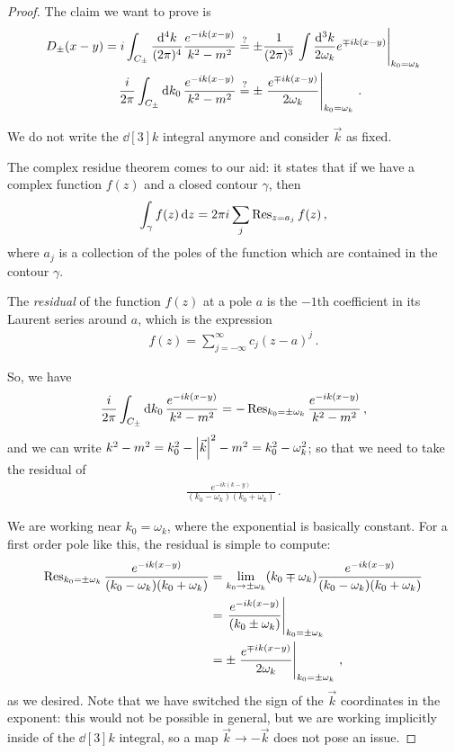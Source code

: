 \documentclass[main.tex]{subfiles}
\begin{document}
\begin{proof}
The claim we want to prove is 
%
\begin{align}
D_{\pm} (x-y) 
= i \int_{C_{\pm}} \frac{ \dd[4]{k}}{(2\pi )^{4}}
\frac{e^{-ik(x-y)}}{k^2 - m^2}
&\overset{?}{=}
\pm \frac{1}{(2 \pi)^3} \eval{\int \frac{ \dd[3]{k}}{2 \omega_{k}} e^{\mp ik (x-y)}}_{k_0 = \omega_{k}}  \\
\frac{i}{2 \pi }
\int_{C_{\pm}} \dd{k_0 } \frac{e^{-ik(x-y)}}{k^2-m^2}
&\overset{?}{=}
\pm \eval{\frac{e^{\mp ik(x-y)}}{2 \omega_{k}}}_{k_0 = \omega_{k}}
\,.
\end{align}

We do not write the \(\dd[3]{k}\) integral anymore and consider \(\vec{k}\) as fixed. 

The complex residue theorem comes to our aid: it states that if we have a complex function \(f(z)\) and a closed contour \(\gamma \), then 
%
\begin{align}
\int_{\gamma } f(z) \dd{z} = 2 \pi i \sum _{j} \Res_{z = a_j} f(z)
\,,
\end{align}
%
where \(a_j\) is a collection of the poles of the function which are contained in the contour \(\gamma \). 

The \emph{residual} of the function \(f(z)\) at a pole \(a\) is the \(-1\)th coefficient in its Laurent series around \(a\), which is the expression 
%
\begin{align}
f(z) = \sum _{j= - \infty }^{ \infty } c_j (z-a)^{j}
\,.
\end{align}

So, we have 
%
\begin{align}
\frac{i}{2 \pi } 
\int_{C_{\pm}} \dd{k_0} 
\frac{e^{-ik(x-y)}}{k^2-m^2} 
= - \Res_{k_0 = \pm \omega_{k}} 
\frac{e^{-ik(x-y)}}{k^2-m^2} 
\,,
\end{align}
%
and we can write \(k^2 - m^2 = k_0^2 - \abs{\vec{k}}^2 - m^2 = k_0^2 - \omega_{k}^2\); so that we need to take the residual of 
%
\begin{align}
\frac{e^{-ik(k-y)}}{(k_0 - \omega_{k}) (k_0 + \omega_{k})}
\,.
\end{align}

We are working near \(k_0 = \omega_{k}\), where the exponential is basically constant.
For a first order pole like this, the residual is simple to compute: 
%
\begin{align}
\Res_{k_0 = \pm \omega_{k}} 
\frac{e^{-ik(x-y)}}{(k_0 - \omega_{k}) (k_0 + \omega_{k})}
&= \lim_{k_0 \to \pm \omega_{k}} 
(k_0 \mp \omega_{k})
\frac{e^{-ik(x-y)}}{(k_0 - \omega_{k}) (k_0 + \omega_{k})}  \\
&= \eval{\frac{e^{-ik(x-y)}}{(k_0 \pm \omega_{k})}}_{k_0 = \pm \omega_{k}}  \\
&= \pm \eval{\frac{e^{\mp ik (x-y)}}{2 \omega_{k}}}_{k_0 = \pm \omega_{k}} 
\,,
\end{align}
%
as we desired. Note that we have switched the sign of the \(\vec{k}\) coordinates in the exponent: this would not be possible in general, but we are working implicitly inside of the \(\dd[3]{k} \) integral, so a map \(\vec{k} \to - \vec{k}\) does not pose an issue.
\end{proof}
\end{document}
